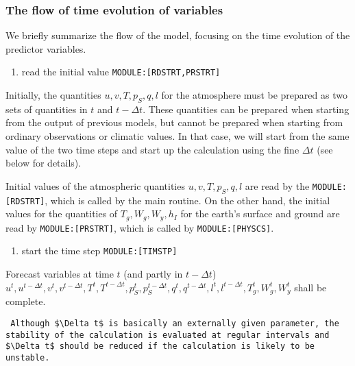\hypertarget{the-flow-of-time-evolution-of-variables}{%
\subsubsection{The flow of time evolution of
variables}\label{the-flow-of-time-evolution-of-variables}}

We briefly summarize the flow of the model, focusing on the time
evolution of the predictor variables.

\begin{enumerate}
\def\labelenumi{\arabic{enumi}.}
\tightlist
\item
  read the initial value \texttt{MODULE:{[}RDSTRT,PRSTRT{]}}
\end{enumerate}

Initially, the quantities \(u, v, T, p_S, q, l\) for the atmosphere must
be prepared as two sets of quantities in \(t\) and \(t-\Delta t\). These
quantities can be prepared when starting from the output of previous
models, but cannot be prepared when starting from ordinary observations
or climatic values. In that case, we will start from the same value of
the two time steps and start up the calculation using the fine
\(\Delta t\) (see below for details).

Initial values of the atmospheric quantities \(u, v, T, p_S, q, l\) are
read by the \texttt{MODULE:{[}RDSTRT{]}}, which is called by the main
routine. On the other hand, the initial values for the quantities of
\(T_g, W_g, W_y, h_I\) for the earth's surface and ground are read by
\texttt{MODULE:{[}PRSTRT{]}}, which is called by
\texttt{MODULE:{[}PHYSCS{]}}.

\begin{enumerate}
\def\labelenumi{\arabic{enumi}.}
\setcounter{enumi}{1}
\tightlist
\item
  start the time step \texttt{MODULE:{[}TIMSTP{]}}
\end{enumerate}

Forecast variables at time \(t\) (and partly in \(t-\Delta t\))
\(u^{t}, u^{t-\Delta t}, v^{t}, v^{t-\Delta t}, T^{t}, T^{t-\Delta t}, p_S^{t}, p_S^{t-\Delta t}, q^{t}, q^{t-\Delta t}, l^{t}, l^{t-\Delta t}, T_g^{t}, W_g^{t}, W_y^{t}\)
shall be complete.

\begin{verbatim}
 Although $\Delta t$ is basically an externally given parameter, the stability of the calculation is evaluated at regular intervals and $\Delta t$ should be reduced if the calculation is likely to be unstable.
\end{verbatim}

